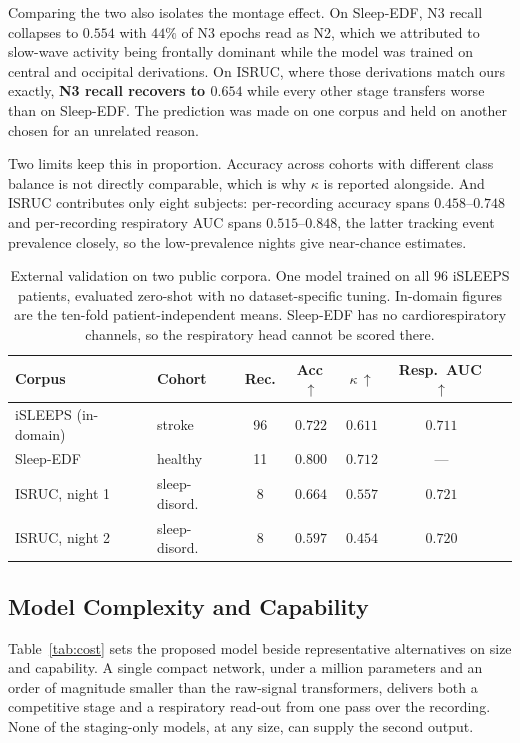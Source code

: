 \documentclass[journal]{IEEEtran}
\newcommand{\mmAcc}{0.722}
\newcommand{\mmK}{0.611}
\newcommand{\mmAuc}{0.711}
\begin{document}
Comparing the two also isolates the montage effect. On Sleep-EDF, N3 recall collapses to
$0.554$ with $44\%$ of N3 epochs read as N2, which we attributed to slow-wave activity
being frontally dominant while the model was trained on central and occipital derivations.
On ISRUC, where those derivations match ours exactly, \textbf{N3 recall recovers to
$0.654$} while every other stage transfers worse than on Sleep-EDF. The prediction was
made on one corpus and held on another chosen for an unrelated reason.

Two limits keep this in proportion. Accuracy across cohorts with different class balance is
not directly comparable, which is why $\kappa$ is reported alongside. And ISRUC contributes
only eight subjects: per-recording accuracy spans $0.458$--$0.748$ and per-recording
respiratory AUC spans $0.515$--$0.848$, the latter tracking event prevalence closely, so
the low-prevalence nights give near-chance estimates.

\begin{table}[t]
\caption{External validation on two public corpora. One model trained on all $96$ iSLEEPS
patients, evaluated zero-shot with no dataset-specific tuning. In-domain figures are the
ten-fold patient-independent means. Sleep-EDF has no cardiorespiratory channels, so the
respiratory head cannot be scored there.}
\label{tab:ext}
\centering
\small
\begin{tabular}{llccccc}
\toprule
Corpus & Cohort & Rec. & Acc\,$\uparrow$ & $\kappa$\,$\uparrow$ & Resp.\ AUC\,$\uparrow$ \\
\midrule
iSLEEPS (in-domain)   & stroke        & 96 & $\mmAcc$ & $\mmK$ & $\mmAuc$ \\
\midrule
Sleep-EDF             & healthy       & 11 & $\mathbf{0.800}$ & $\mathbf{0.712}$ & --- \\
ISRUC, night 1        & sleep-disord. &  8 & $0.664$ & $0.557$ & $\mathbf{0.721}$ \\
ISRUC, night 2        & sleep-disord. &  8 & $0.597$ & $0.454$ & $0.720$ \\
\bottomrule
\end{tabular}
\end{table}

\subsection{Model Complexity and Capability}
Table~\ref{tab:cost} sets the proposed model beside representative alternatives on size and
capability. A single compact network, under a million parameters and an order of magnitude
smaller than the raw-signal transformers, delivers both a competitive stage and a respiratory
read-out from one pass over the recording. None of the staging-only models, at any size, can
supply the second output.
\end{document}
